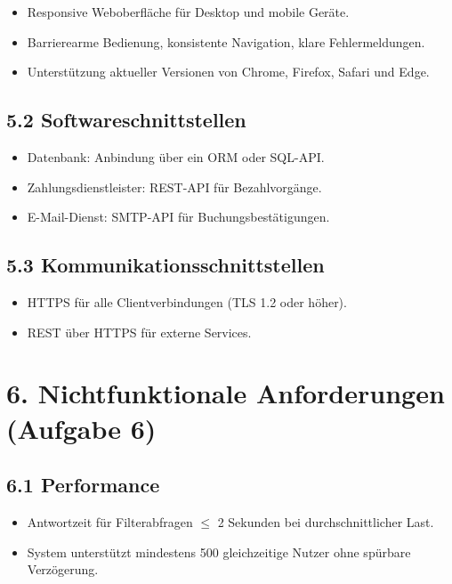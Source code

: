\documentclass[
	fontsize=12pt,          %
	paper=a4,               %
	numbers=noenddot,       %
	listof=totoc,           %
	listof=entryprefix,     %
	listof=nochaptergap,    %
	bibliography=totoc,     %
	parskip=half,           %
	openany                 %
]{scrbook}
\begin{document}
\begin{itemize}
	\item Responsive Weboberfläche für Desktop und mobile Geräte.
	\item Barrierearme Bedienung, konsistente Navigation, klare Fehlermeldungen.
	\item Unterstützung aktueller Versionen von Chrome, Firefox, Safari und Edge.
\end{itemize}


\section*{5.2 Softwareschnittstellen}

\begin{itemize}
	\item Datenbank: Anbindung über ein ORM oder SQL-API.
	\item Zahlungsdienstleister: REST-API für Bezahlvorgänge.
	\item E-Mail-Dienst: SMTP-API für Buchungsbestätigungen.
\end{itemize}


\section*{5.3 Kommunikationsschnittstellen}

\begin{itemize}
	\item HTTPS für alle Clientverbindungen (TLS 1.2 oder höher).
	\item REST über HTTPS für externe Services.
\end{itemize}


\chapter*{6. Nichtfunktionale Anforderungen \normalfont\normalsize(Aufgabe 6)}


\section*{6.1 Performance}

\begin{itemize}
	\item Antwortzeit für Filterabfragen $\leq$ 2 Sekunden bei durchschnittlicher Last.
	\item System unterstützt mindestens 500 gleichzeitige Nutzer ohne spürbare Verzögerung.
\end{itemize}
\end{document}
